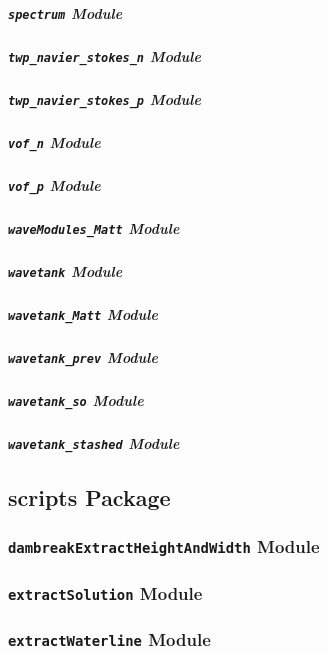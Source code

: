 \documentclass[letterpaper,12pt,english]{sphinxmanual}
\begin{document}
\subparagraph{\texttt{spectrum} Module}
\label{api/benchmarks.wavetank_reflecting:spectrum-module}

\subparagraph{\texttt{twp\_navier\_stokes\_n} Module}
\label{api/benchmarks.wavetank_reflecting:twp-navier-stokes-n-module}

\subparagraph{\texttt{twp\_navier\_stokes\_p} Module}
\label{api/benchmarks.wavetank_reflecting:twp-navier-stokes-p-module}

\subparagraph{\texttt{vof\_n} Module}
\label{api/benchmarks.wavetank_reflecting:vof-n-module}

\subparagraph{\texttt{vof\_p} Module}
\label{api/benchmarks.wavetank_reflecting:vof-p-module}

\subparagraph{\texttt{waveModules\_Matt} Module}
\label{api/benchmarks.wavetank_reflecting:wavemodules-matt-module}

\subparagraph{\texttt{wavetank} Module}
\label{api/benchmarks.wavetank_reflecting:wavetank-module}

\subparagraph{\texttt{wavetank\_Matt} Module}
\label{api/benchmarks.wavetank_reflecting:wavetank-matt-module}

\subparagraph{\texttt{wavetank\_prev} Module}
\label{api/benchmarks.wavetank_reflecting:wavetank-prev-module}

\subparagraph{\texttt{wavetank\_so} Module}
\label{api/benchmarks.wavetank_reflecting:wavetank-so-module}

\subparagraph{\texttt{wavetank\_stashed} Module}
\label{api/benchmarks.wavetank_reflecting:wavetank-stashed-module}

\subsection{scripts Package}
\label{api/scripts:scripts-package}\label{api/scripts::doc}

\subsubsection{\texttt{dambreakExtractHeightAndWidth} Module}
\label{api/scripts:dambreakextractheightandwidth-module}

\subsubsection{\texttt{extractSolution} Module}
\label{api/scripts:extractsolution-module}

\subsubsection{\texttt{extractWaterline} Module}
\label{api/scripts:extractwaterline-module}
\end{document}

